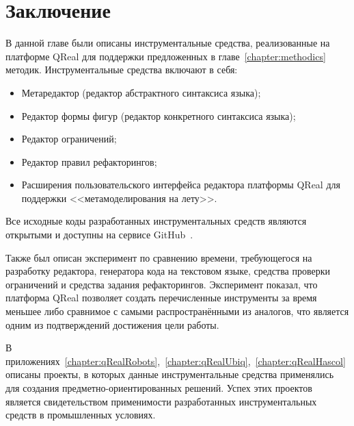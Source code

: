 \section{Заключение}
В данной главе были описаны инструментальные средства, реализованные на платформе
QReal для поддержки предложенных в главе~\ref{chapter:methodics} методик. Инструментальные средства включают в себя:
\begin{itemize}
	\item Метаредактор (редактор абстрактного синтаксиса языка);
	\item Редактор формы фигур (редактор конкретного синтаксиса языка);
	\item Редактор ограничений;
	\item Редактор правил рефакторингов;
	\item Расширения пользовательского интерфейса редактора платформы QReal для поддержки
		<<метамоделирования на лету>>.
\end{itemize}

Все исходные коды разработанных инструментальных средств являются открытыми и доступны
на сервисе GitHub~\cite{qrealGithub}.

Также был описан эксперимент по сравнению времени, требующегося на разработку редактора,
генератора кода на текстовом языке, средства проверки ограничений и средства задания рефакторингов.
Эксперимент показал, что платформа QReal позволяет создать перечисленные инструменты за время
меньшее либо сравнимое с самыми распространёнными из аналогов, что является одним из подтверждений достижения
цели работы.

В приложениях~\ref{chapter:qRealRobots},~\ref{chapter:qRealUbiq},~\ref{chapter:qRealHascol} описаны
проекты, в которых данные инструментальные средства применялись для создания предметно-ориентированных решений.
Успех этих проектов является свидетельством применимости разработанных инструментальных средств
в промышленных условиях.
